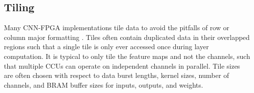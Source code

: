 \subsection{Tiling}
Many CNN-FPGA implementations tile data to avoid the pitfalls of row or column major formatting \cite{tu2017deep, dicecco2016caffeinated, bettoni2017convolutional, guo2018angel}. Tiles often contain duplicated data in their overlapped regions such that a single tile is only ever accessed once during layer computation. It is typical to only tile the feature maps and not the channels, such that multiple CCUs can operate on independent channels in parallel. Tile sizes are often chosen with respect to data burst lengths, kernel sizes, number of channels, and BRAM buffer sizes for inputs, outputs, and weights.